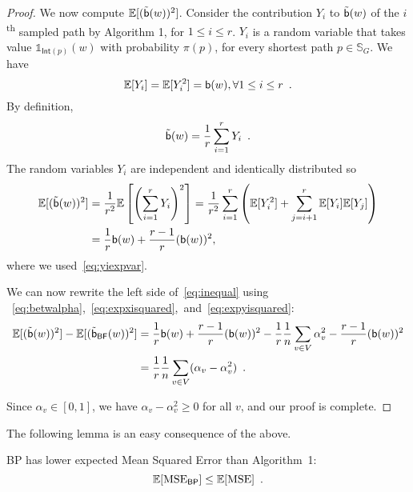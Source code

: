 \begin{proof}
We now compute $\mathbb{E}[(\tilde{\mathsf{b}}(w))^2]$. 
Consider the contribution $Y_i$ to $\tilde{\mathsf{b}}(w)$ of the
$i$\textsuperscript{th} sampled path by Algorithm 1, for $1\le i\le r$. $Y_i$ is a random variable that takes value
$\mathds{1}_{\mathsf{Int}(p)}(w)$ with probability $\pi(p)$, for every shortest
path $p\in\mathbb{S}_G$. We have
\begin{equation}\label{eq:yiexpvar}
  \exp[Y_i]=\exp[Y_i^2]=\betw(w), \forall 1\le i \le r\enspace.
\end{equation}
By definition, 
\[
\tilde{\mathsf{b}}(w)=\frac{1}{r}\sum_{i=1}^rY_i\enspace.
\]
The random variables $Y_i$ are independent and identically distributed so
\begin{align}\label{eq:expyisquared}
  \exp[(\tilde\betw(w))^2]&=\frac{1}{r^2}\exp\left[\left(\sum_{i=1}^r
  Y_i\right)^2\right]=\frac{1}{r^2}\sum_{i=1}^r\left(\exp[Y_i^2]+\sum_{j=i+1}^r\exp[Y_i]\exp[Y_j]\right)\nonumber\\
  &=\frac{1}{r}\betw(w)+\frac{r-1}{r}(\betw(w))^2,
\end{align}
where we used~\eqref{eq:yiexpvar}.

We can now rewrite the left side of~\eqref{eq:inequal} using
~\eqref{eq:betwalpha},~\eqref{eq:expxisquared},~and~\eqref{eq:expyisquared}:
\begin{align*}
  \mathbb{E}[(\tilde{\mathsf{b}}(w))^2]-\mathbb{E}[(\tilde{\mathsf{b}}_\mathsf{BF}(w))^2] &=
  \frac{1}{r}\mathsf{b}(w)+\frac{r-1}{r}(\mathsf{b}(w))^2 - \frac{1}{r}\frac{1}{n}\sum_{v\in
    V}\alpha_v^2
   -\frac{r-1}{r}(\mathsf{b}(w))^2\\
   &= \frac{1}{r}\frac{1}{n}\sum_{v\in V}(\alpha_v - \alpha_v^2)\enspace. 
\end{align*}

Since $\alpha_v\in[0,1]$, we have $\alpha_v-\alpha_v^2\ge 0$ for all $v$, and our proof
is complete.
\end{proof}

The following lemma is an easy consequence of the above.

\begin{lemma}\label{lem:MSE}
  \textsf{BP} has lower expected Mean Squared Error than Algorithm~1:
  \[
  \mathbb{E}[\mathrm{MSE}_\mathsf{BP}]\le \mathbb{E}[\mathrm{MSE}]\enspace.
  \]
\end{lemma}

